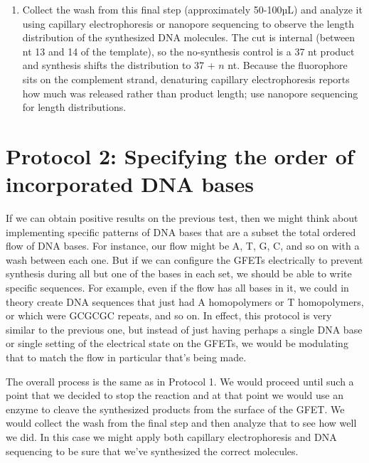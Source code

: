 \documentclass[11pt]{article}
\begin{document}
\begin{enumerate}
    \begin{enumerate} %
        \item Flow the 5'-fluoroscein-labelled reverse complement \texttt{fluor-tgtaatc} (50\,nt) over the chip and anneal with a temperature ramp: heat to about 90 °C, then cool slowly to 37 °C. The full-length duplex melts at high temperature, so a 37 °C soak alone will neither denature nor reanneal it.
        \item Flow HindIII and incubate at 37 °C to cleave the synthesized products from the surface of the GFET.
    \end{enumerate}
    \item Collect the wash from this final step (approximately 50-100µL) and analyze it using capillary electrophoresis or nanopore sequencing to observe the length distribution of the synthesized DNA molecules. The cut is internal (between nt 13 and 14 of the template), so the no-synthesis control is a 37 nt product and synthesis shifts the distribution to 37 + $n$ nt. Because the fluorophore sits on the complement strand, denaturing capillary electrophoresis reports how much was released rather than product length; use nanopore sequencing for length distributions.
\end{enumerate}

\section*{Protocol 2: Specifying the order of incorporated DNA bases}

If we can obtain positive results on the previous test, then we might think about implementing specific patterns of DNA bases that are a subset the total ordered flow of DNA bases.
For instance, our flow might be A, T, G, C, and so on with a wash between each one.
But if we can configure the GFETs electrically to prevent synthesis during all but one of the bases in each set, we should be able to write specific sequences.
For example, even if the flow has all bases in it, we could in theory create DNA sequences that just had A homopolymers or T homopolymers, or which were GCGCGC repeats, and so on.
In effect, this protocol is very similar to the previous one, but instead of just having perhaps a single DNA base or single setting of the electrical state on the GFETs, we would be modulating that to match the flow in particular that's being made.

The overall process is the same as in Protocol 1.
We would proceed until such a point that we decided to stop the reaction and at that point we would use an enzyme to cleave the synthesized products from the surface of the GFET.
We would collect the wash from the final step and then analyze that to see how well we did.
In this case we might apply both capillary electrophoresis and DNA sequencing to be sure that we've synthesized the correct molecules.
\end{document}
